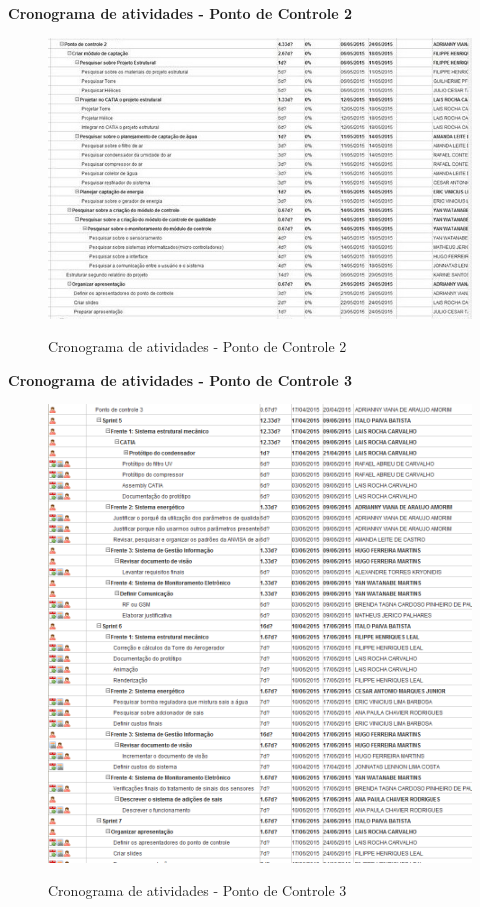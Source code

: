    \pagebreak
   \textbf{Cronograma de atividades - Ponto de Controle 2}
   \begin{figure}[!h]
    \centering
    \includegraphics[scale = 0.8]{editaveis/figuras/cronogramaPC2}
    \label{Cronograma de atividades PC2}
    \caption{Cronograma de atividades - Ponto de Controle 2}
   \end{figure}
   \FloatBarrier
   
   \pagebreak
   \textbf{Cronograma de atividades - Ponto de Controle 3}
   \begin{figure}[!h]
    \centering
     \includegraphics[scale = 0.8]{editaveis/figuras/cronogramaPC3}
    \label{Cronograma de atividades PC3}
    \caption{Cronograma de atividades - Ponto de Controle 3}
   \end{figure}
   \FloatBarrier
   
